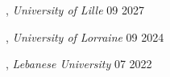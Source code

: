 
, \textit{University of Lille}	\hfill 09 2027

, \textit{University of Lorraine} \hfill	09 2024

, \textit{Lebanese University} \hfill 	07 2022
